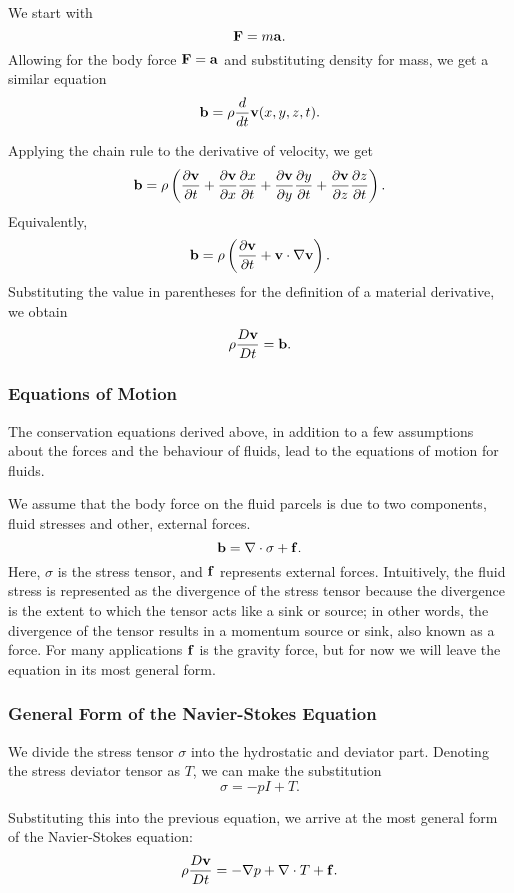 We start with 
\[\mathbf{ F} = m\mathbf{  a}.\]
Allowing for the body force $\mathbf{ F}=\mathbf{  a}$ and substituting density for mass, we get a similar equation
\[\mathbf{ b} = \rho \dfrac{d}{dt} \mathbf{ v}(x,y,z,t).\]


Applying the chain rule to the derivative of velocity, we get
\[\mathbf{ b} = \rho\left(\dfrac{\partial \mathbf{ v}}{\partial t} + \dfrac{\partial \mathbf{ v}}{\partial x}\dfrac{\partial x}{\partial t}  + \dfrac{\partial \mathbf{ v}}{\partial y}\dfrac{\partial y}{\partial t} + \dfrac{\partial \mathbf{ v}}{\partial z}\dfrac{\partial z}{\partial t}\right).\]
Equivalently,
\[\mathbf{ b} = \rho\left(\dfrac{\partial \mathbf{ v}}{\partial t} + \mathbf{ v} \cdot \nabla \mathbf{ v}\right).\]
Substituting the value in parentheses for the definition of a material derivative, we obtain 
\begin{equation}
 \rho\dfrac{D\mathbf{ v}}{Dt} = \mathbf{ b}. \label{eq:mom}
\end{equation}

\subsubsection*{Equations of Motion}

The conservation equations derived above, in addition to a few assumptions about the forces and the behaviour of fluids, lead to the equations of motion for fluids. 

We assume that the body force on the fluid parcels is due to two components, fluid stresses and other, external forces. 
\begin{equation}
 \mathbf{ b} = \nabla \cdot \sigma + \mathbf{ f}. \label{eq:mot}
\end{equation}
Here, $\sigma$ is the stress tensor, and $\mathbf{ f}$ represents external forces. Intuitively, the fluid stress is represented as the divergence of the stress tensor because the divergence is the extent to which the tensor acts like a sink or source; in other words, the divergence of the tensor results in a momentum source or sink, also known as a force. 
For many applications  $\mathbf{ f}$ is the gravity force, but for now we will leave the equation in its most general form. 



\subsubsection*{General Form of the Navier-Stokes Equation}

We divide the  stress tensor $\sigma$  into  the hydrostatic and deviator part. Denoting the stress deviator tensor as $T$, we can make the substitution
\begin{equation}
 \sigma = -pI + T.
\end{equation}


Substituting this into the previous equation, we arrive at the most general form of the Navier-Stokes equation:
\begin{equation}
 \rho\dfrac{D\mathbf{ v}}{Dt} = -\nabla p + \nabla \cdot T + \mathbf{ f}.
\end{equation}
